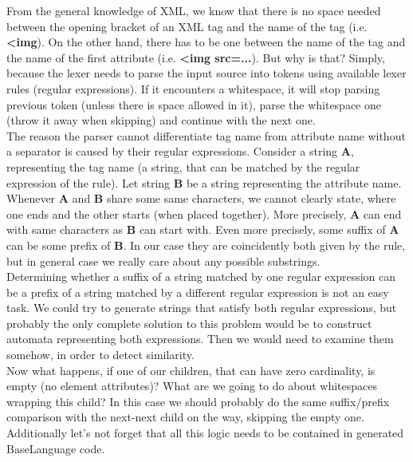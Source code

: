 From the general knowledge of XML, we know that there is no space needed between the opening bracket of an XML tag and the name of the tag (i.e. \textbf{{\textless}img}).
On the other hand, there has to be one between the name of the tag and the name of the first attribute (i.e. \textbf{{\textless}img src=...}).
But why is that?
Simply, because the lexer needs to parse the input source into tokens using available lexer rules (regular expressions).
If it encounters a whitespace, it will stop parsing previous token (unless there is space allowed in it), parse the whitespace one (throw it away when skipping) and continue with the next one.
\\

The reason the parser cannot differentiate tag name from attribute name without a separator is caused by their regular expressions.
Consider a string \textbf{A}, representing the tag name (a string, that can be matched by the regular expression of the  rule).
Let string \textbf{B} be a string representing the attribute name.
Whenever \textbf{A} and \textbf{B} share some same characters, we cannot clearly state, where one ends and the other starts (when placed together).
More precisely, \textbf{A} can end with same characters as \textbf{B} can start with.
Even more precisely, some suffix of \textbf{A} can be some prefix of \textbf{B}.
In our case they are coincidently both given by the  rule, but in general case we really care about any possible substrings.
\\

Determining whether a suffix of a string matched by one regular expression can be a prefix of a string matched by a different regular expression is not an easy task.
We could try to generate strings that satisfy both regular expressions, but probably the only complete solution to this problem would be to construct automata representing both expressions.
Then we would need to examine them somehow, in order to detect similarity.
\\

Now what happens, if one of our children, that can have zero cardinality, is empty (no element attributes)?
What are we going to do about whitespaces wrapping this child?
In this case we should probably do the same suffix/prefix comparison with the next-next child on the way, skipping the empty one.
Additionally let's not forget that all this logic needs to be contained in generated BaseLanguage code.
\\

